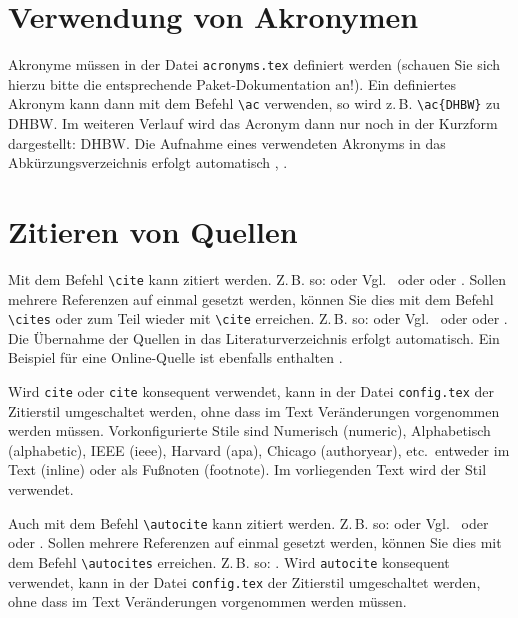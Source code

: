 \section{Verwendung von Akronymen}
Akronyme müssen in der Datei \texttt{acronyms.tex} definiert werden (schauen Sie sich hierzu bitte die entsprechende 
Paket-Dokumentation an!). Ein definiertes Akronym kann dann mit dem Befehl \texttt{\textbackslash ac} verwenden, so wird 
z.\,B. \texttt{\textbackslash ac\{DHBW\}} zu \ac{DHBW}. Im weiteren Verlauf wird das Acronym dann nur noch in der Kurzform 
dargestellt: \ac{DHBW}. Die Aufnahme eines verwendeten Akronyms in das Abkürzungsverzeichnis erfolgt automatisch 
\autocite[Vgl.][S. 77ff]{TestOnlineQuelle}, \autocite[Vgl.][S. 42]{ME12}. 

\section{Zitieren von Quellen}
Mit dem Befehl \texttt{\textbackslash cite} kann zitiert werden. Z.\,B. so: \cite[Vgl.][S.~18ff]{ME12} oder Vgl.~\cite[S.~18ff]{ME12} 
oder \cite[S.~18ff]{ME12} oder \cite{ME12}. Sollen mehrere Referenzen auf einmal gesetzt werden, können Sie dies mit dem 
Befehl \texttt{\textbackslash cites} oder zum Teil wieder mit 
\texttt{\textbackslash cite} erreichen. Z.\,B. so: \cites[Vgl.][S. 10]{ME12}[Vgl.][S. 100]{TD15}  
oder Vgl.~\cite{ME12, TD15} oder oder \cite{ME12, TD15}. Die Übernahme der Quellen in das Literaturverzeichnis erfolgt automatisch. 
Ein Beispiel für eine Online-Quelle ist ebenfalls enthalten \cite{TestOnlineQuelle}.

Wird \texttt{cite} oder \texttt{cite} konsequent verwendet, kann in der Datei \texttt{config.tex} der Zitierstil umgeschaltet 
werden, ohne dass im Text Veränderungen vorgenommen werden müssen. Vorkonfigurierte Stile sind Numerisch (numeric), 
Alphabetisch (alphabetic), IEEE (ieee), Harvard (apa), Chicago (authoryear), etc.~entweder im Text (inline) oder als Fußnoten 
(footnote). Im vorliegenden Text wird der Stil  verwendet.

Auch mit dem Befehl \texttt{\textbackslash autocite} kann zitiert werden. Z.\,B. so: \autocite[Vgl.][S.~18ff]{ME12}
oder Vgl.~\autocite[S.~18ff]{ME12} oder \autocite[S.~18ff]{ME12} oder \autocite{ME12}{.} Sollen mehrere Referenzen auf einmal 
gesetzt werden, können Sie dies mit dem Befehl \texttt{\textbackslash autocites} erreichen. Z.\,B. so:
\autocites[Vgl.][S. 10]{ME12}[][S. 100]{TD15}. Wird \texttt{autocite} konsequent verwendet, kann in der Datei 
\texttt{config.tex} der Zitierstil umgeschaltet werden, ohne dass im Text Veränderungen vorgenommen werden müssen. 

